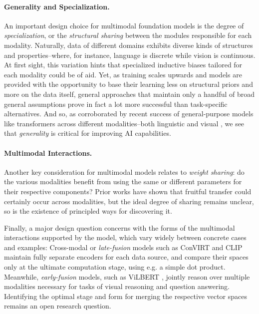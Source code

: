 \paragraph{Generality and Specialization.} An important design choice for multimodal foundation models is the degree of \textit{specialization}, or the  \textit{structural sharing} between the modules responsible for each modality. Naturally, data of different domains exhibits diverse kinds of structures and properties--where, for instance, language is discrete while vision is continuous. At first sight, this variation hints that specialized inductive biases tailored for each modality could be of aid. Yet, as training scales upwards and models are provided with the opportunity to base their learning less on structural priors and more on the data itself, general approaches that maintain only a handful of broad general assumptions prove in fact a lot more successful than task-specific alternatives. And so, as corroborated by recent success of general-purpose models like transformers across different modalities--both linguistic \citep{liu2019roberta,albert} and visual \citep{visual_transformer,ganformer}, we see that \textit{generality} is critical for improving AI capabilities.

\paragraph{Multimodal Interactions.} Another key consideration for multimodal models relates to \textit{weight sharing}: do the various modalities benefit from using the same or different parameters for their respective components? Prior works have shown that fruitful transfer could certainly occur across modalities, but the ideal degree of sharing remains unclear, so is the existence of principled ways for discovering it. 

Finally, a major design question concerns with the forms of the multimodal interactions supported by the model, which vary widely between concrete cases and examples: Cross-modal or \textit{late-fusion} models such as ConVIRT \citep{convirt} and CLIP \citep{radford2021learning} maintain fully separate encoders for each data source, and compare their spaces only at the ultimate computation stage, using e.g. a simple dot product. Meanwhile, \textit{early-fusion} models, such as ViLBERT \citep{Lu2019ViLBERTPT, cho2021unifying}, jointly reason over multiple modalities necessary for tasks of visual reasoning and question answering. Identifying the optimal stage and form for merging the respective vector spaces \citep{attention_bottlenecks} remains an open research question.

